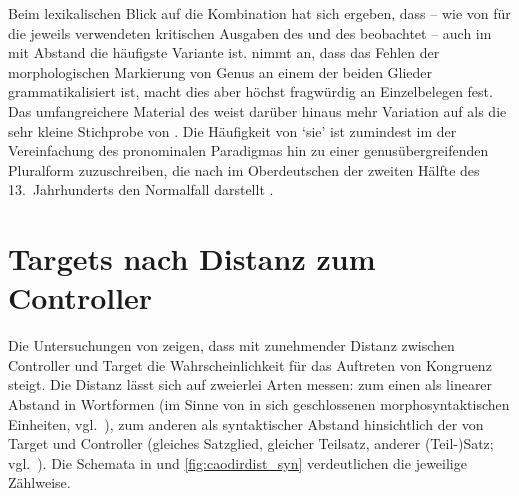 Beim lexikalischen Blick auf die Kombination  hat sich ergeben,
dass -- wie von \citet{askedal1973} für die jeweils verwendeten kritischen
Ausgaben des  und des  beobachtet -- auch im
\CAO{} mit Abstand die häufigste Variante  ist.
\citeauthor{askedal1973} nimmt an, dass das Fehlen der morphologischen
Markierung von Genus an einem der beiden Glieder
grammatikalisiert ist, macht dies aber höchst fragwürdig an Einzelbelegen fest.
Das umfangreichere Material des \CAO{} weist darüber hinaus mehr Variation auf
als die sehr kleine Stichprobe von \citeauthor{askedal1973}. Die
Häufigkeit von  `sie' ist zumindest im \CAO{} der
Vereinfachung des pronominalen Paradigmas hin zu einer
genusübergreifenden Pluralform
zuzuschreiben, die nach \citet[391--392]{ksw2}
im Oberdeutschen der zweiten Hälfte des 13.~Jahrhunderts den
Normalfall darstellt \autocite[vgl.\ auch][37--39]{sparmann1961}.


\section{Targets nach Distanz zum Controller}
\label{sec:caotargdist}


Die Untersuchungen von \citet{corbett1979} zeigen, dass mit zunehmender Distanz
zwischen Controller und Target die Wahrscheinlichkeit für das Auftreten von
Kongruenz  steigt. Die Distanz lässt sich auf zweierlei Arten
messen: zum einen als linearer Abstand in Wortformen (im
Sinne von in sich geschlossenen morphosyntaktischen Einheiten,
vgl.~\cite[252--253]{bauer2000}), zum anderen als syntaktischer
Abstand hinsichtlich der  von Target und
Controller (gleiches Satzglied, gleicher Teilsatz, anderer (Teil-)Satz;
vgl.~). Die Schemata in
 und \ref{fig:caodirdist_syn} verdeutlichen die
jeweilige Zählweise.

